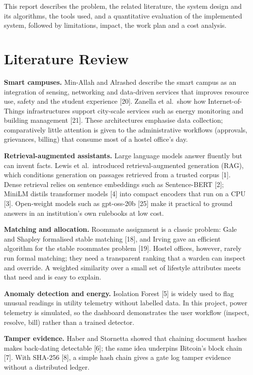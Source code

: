 \documentclass[12pt,a4paper,oneside]{report}
\begin{document}
This report describes the problem, the related literature, the system design and its algorithms, the tools used, and a
quantitative evaluation of the implemented system, followed by limitations, impact, the work plan and a cost analysis.

\section{Literature Review}
\textbf{Smart campuses.} Min-Allah and Alrashed describe the smart campus as an integration of sensing, networking and
data-driven services that improves resource use, safety and the student experience [20]. Zanella et al.\ show how
Internet-of-Things infrastructures support city-scale services such as energy monitoring and building management [21].
These architectures emphasise data collection; comparatively little attention is given to the administrative
workflows (approvals, grievances, billing) that consume most of a hostel office's day.

\textbf{Retrieval-augmented assistants.} Large language models answer fluently but can invent facts. Lewis et al.\
introduced retrieval-augmented generation (RAG), which conditions generation on passages retrieved from a trusted corpus
[1]. Dense retrieval relies on sentence embeddings such as Sentence-BERT [2]; MiniLM distils transformer models [4] into
compact encoders that run on a CPU [3]. Open-weight models such as gpt-oss-20b [25] make it practical to ground answers
in an institution's own rulebooks at low cost.

\textbf{Matching and allocation.} Roommate assignment is a classic problem: Gale and Shapley formalised stable matching
[18], and Irving gave an efficient algorithm for the stable roommates problem [19]. Hostel offices, however, rarely run
formal matching; they need a transparent ranking that a warden can inspect and override. A weighted similarity over a
small set of lifestyle attributes meets that need and is easy to explain.

\textbf{Anomaly detection and energy.} Isolation Forest [5] is widely used to flag unusual readings in utility
telemetry without labelled data. In this project, power telemetry is simulated, so the dashboard demonstrates the user
workflow (inspect, resolve, bill) rather than a trained detector.

\textbf{Tamper evidence.} Haber and Stornetta showed that chaining document hashes makes back-dating detectable [6]; the
same idea underpins Bitcoin's block chain [7]. With SHA-256 [8], a simple hash chain gives a gate log tamper evidence
without a distributed ledger.
\end{document}
